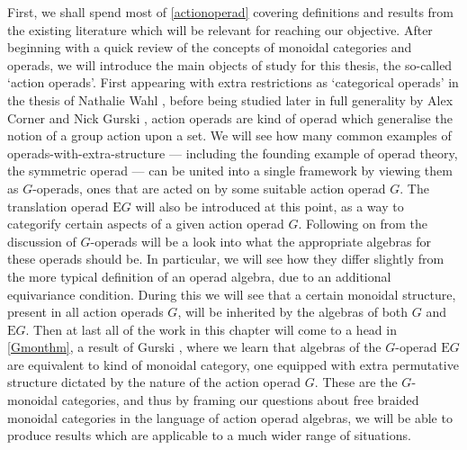 First, we shall spend most of \cref{actionoperad} covering definitions and results from the existing literature which will be relevant for reaching our objective. After beginning with a quick review of the concepts of monoidal categories and operads, we will introduce the main objects of study for this thesis, the so-called `action operads'. First appearing with extra restrictions as `categorical operads' in the thesis of Nathalie Wahl \cite{ribbon1}, before being studied later in full generality by Alex Corner and Nick Gurski \cite{ogge}, action operads are kind of operad which generalise the notion of a group action upon a set. We will see how many common examples of operads-with-extra-structure --- including the founding example of operad theory, the symmetric operad \cite{gils} --- can be united into a single framework by viewing them as $G$-operads, ones that are acted on by some suitable action operad $G$. The translation operad $\mathrm{E}G$ will also be introduced at this point, as a way to categorify certain aspects of a given action operad $G$. Following on from the discussion of $G$-operads will be a look into what the appropriate algebras for these operads should be. In particular, we will see how they differ slightly from the more typical definition of an operad algebra, due to an additional equivariance condition. During this we will see that a certain monoidal structure, present in all action operads $G$, will be inherited by the algebras of both $G$ and $\mathrm{E}G$. Then at last all of the work in this chapter will come to a head in \cref{Gmonthm}, a result of Gurski \cite{operadborel}, where we learn that algebras of the $G$-operad $\mathrm{E}G$ are equivalent to kind of monoidal category, one equipped with extra permutative structure dictated by the nature of the action operad $G$. These are the $G$-monoidal categories, and thus by framing our questions about free braided monoidal categories in the language of action operad algebras, we will be able to produce results which are applicable to a much wider range of situations. 

